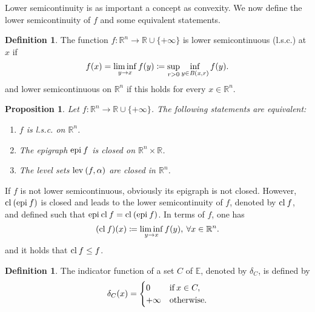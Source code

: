 \documentclass[a4paper,11pt, oneside]{book}
\newtheorem{prop}[thm]{Proposition}
\theoremstyle{definition}
\newtheorem{dfn}[thm]{Definition}
\newcommand{\RealNumberSet}{\mathbb{R}}
\newcommand{\NDemenstionalRealEuclideanSpace}{\mathbb{R}^n}
\newcommand{\Closure}[1]{\text{\rm cl\:${#1}$}} %
\newcommand{\Epigraph}[1]{\text{\rm epi\:${#1}$}} %
\newcommand{\LevelSets}[2]{\text{\rm lev\:$({#1}, {#2})$}} %
\newcommand{\ExtendedRealValuedFunction}[2]{{#1}: {#2} \to \RealNumberSet \cup \{+\infty\}}
\newcommand{\IndicatorFunction}[1]{\delta_{#1}}
\begin{document}
Lower semicontinuity is as important a concept as convexity. We now define the lower semicontinuity of $f$ and some equivalent statements.

\begin{dfn}
  The function $\ExtendedRealValuedFunction{f}{\NDemenstionalRealEuclideanSpace}$ is lower semicontinuous (l.s.c.) at $x$ if
  \begin{equation}
    f(x) = \liminf_{y \to x} f(y) \coloneqq \sup_{r >0} \inf_{y \in \it{B}(x,r)} f(y). \notag
  \end{equation}
  and lower semicontinuous on $\NDemenstionalRealEuclideanSpace$ if this holds for every $x \in \NDemenstionalRealEuclideanSpace$.
\end{dfn}

\begin{prop}
  Let $\ExtendedRealValuedFunction{f}{\NDemenstionalRealEuclideanSpace}$. The following statements are equivalent:
  \begin{enumerate}[label=\roman*,align=CenterWithParen]
    \item $f$ is l.s.c. on $\NDemenstionalRealEuclideanSpace$.
    \item The epigraph $\Epigraph{f}$ is closed on $\NDemenstionalRealEuclideanSpace \times \RealNumberSet$.
    \item The level sets $\LevelSets{f}{\alpha}$ are closed in $\NDemenstionalRealEuclideanSpace$.
  \end{enumerate}
\end{prop}

If $f$ is not lower semicontinuous, obviously its epigraph is not closed. However, $\Closure{(\Epigraph{f})}$ is closed and leads to the lower semicontinuity of $f$, denoted by $\Closure{f}$, and defined such that $\Epigraph{\Closure{f}} = \Closure{(\Epigraph{f})}$. In terms of $f$, one has
\begin{equation}
  (\Closure{f})(x) \coloneqq \liminf_{y \to x} f(y),\: \forall x \in \NDemenstionalRealEuclideanSpace. \notag
\end{equation}
and it holds that $\Closure{f} \leq f$.

\begin{dfn}
  The indicator function of a set $C$ of $\mathbb{E}$, denoted by $\IndicatorFunction{C}$, is defined by
  \begin{equation}
    \IndicatorFunction{C}(x)=
    \begin{cases}
      0 & \text{if}\:x \in{C}, \\
      +\infty & \text{otherwise}. \notag
    \end{cases}
  \end{equation}
\end{dfn}
\end{document}
